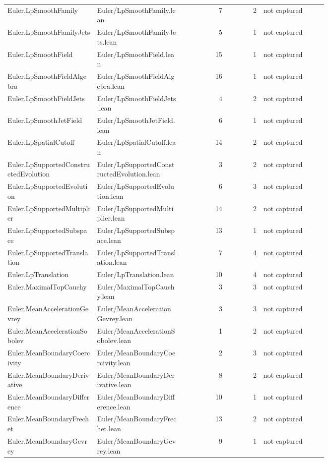 \documentclass[10pt]{article}
\begin{document}
\begin{longtable}{p{0.28\linewidth}p{0.27\linewidth}r r p{0.20\linewidth}}
Euler.LpSmoothFamily & Euler/LpSmoothFamily.lean & 7 & 2 & not captured\\
Euler.LpSmoothFamilyJets & Euler/LpSmoothFamilyJets.lean & 5 & 1 & not captured\\
Euler.LpSmoothField & Euler/LpSmoothField.lean & 15 & 1 & not captured\\
Euler.LpSmoothFieldAlgebra & Euler/LpSmoothFieldAlgebra.lean & 16 & 1 & not captured\\
Euler.LpSmoothFieldJets & Euler/LpSmoothFieldJets.lean & 4 & 2 & not captured\\
Euler.LpSmoothJetField & Euler/LpSmoothJetField.lean & 6 & 1 & not captured\\
Euler.LpSpatialCutoff & Euler/LpSpatialCutoff.lean & 14 & 2 & not captured\\
Euler.LpSupportedConstructedEvolution & Euler/LpSupportedConstructedEvolution.lean & 3 & 2 & not captured\\
Euler.LpSupportedEvolution & Euler/LpSupportedEvolution.lean & 6 & 3 & not captured\\
Euler.LpSupportedMultiplier & Euler/LpSupportedMultiplier.lean & 14 & 2 & not captured\\
Euler.LpSupportedSubspace & Euler/LpSupportedSubspace.lean & 13 & 1 & not captured\\
Euler.LpSupportedTranslation & Euler/LpSupportedTranslation.lean & 7 & 4 & not captured\\
Euler.LpTranslation & Euler/LpTranslation.lean & 10 & 4 & not captured\\
Euler.MaximalTopCauchy & Euler/MaximalTopCauchy.lean & 3 & 3 & not captured\\
Euler.MeanAccelerationGevrey & Euler/MeanAccelerationGevrey.lean & 3 & 3 & not captured\\
Euler.MeanAccelerationSobolev & Euler/MeanAccelerationSobolev.lean & 1 & 2 & not captured\\
Euler.MeanBoundaryCoercivity & Euler/MeanBoundaryCoercivity.lean & 2 & 3 & not captured\\
Euler.MeanBoundaryDerivative & Euler/MeanBoundaryDerivative.lean & 8 & 2 & not captured\\
Euler.MeanBoundaryDifference & Euler/MeanBoundaryDifference.lean & 10 & 1 & not captured\\
Euler.MeanBoundaryFrechet & Euler/MeanBoundaryFrechet.lean & 13 & 2 & not captured\\
Euler.MeanBoundaryGevrey & Euler/MeanBoundaryGevrey.lean & 9 & 1 & not captured\\

\end{longtable}
\end{document}
